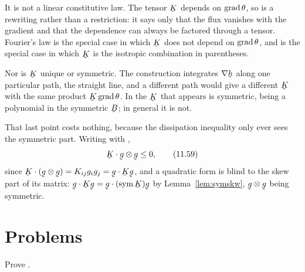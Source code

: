 \begin{remark}\label{rem:ch11Kread}
It is not a linear constitutive law. The tensor $\bK$ depends on
$\operatorname{grad}\theta$, so  is a rewriting rather than a restriction:
it says only that the flux vanishes with the gradient and that the
dependence can always be factored through a tensor. Fourier's law is
the special case in which $\bK$ does not depend on $\operatorname{grad}\theta$, and
 is the special case in which $\bK$ is the isotropic
combination in parentheses.

Nor is $\bK$ unique or symmetric. The construction integrates
$\nabla\bh$ along one particular path, the straight line, and a
different path would give a different $\bK$ with the same product
$\bK\grad\theta$. In  the $\bK$ that appears is symmetric,
being a polynomial in the symmetric $\bB$; in general it is not.

That last point costs nothing, because the dissipation inequality only
ever sees the symmetric part. Writing  with ,
\begin{equation}
   \bK\cdot\bg\otimes\bg\leq0 ,
   \tag{11.59}\label{eq:11.59}
\end{equation}
since $\bK\cdot(\bg\otimes\bg)=K_{ij}g_{i}g_{j}=\ip\bg{\bK\bg}$, and a
quadratic form is blind to the skew part of its matrix: $\ip\bg{\bK\bg}
=\ip\bg{(\Sym\bK)\bg}$ by Lemma~\ref{lem:symskw}, $\bg\otimes\bg$ being
symmetric.
\end{remark}

\setcounter{problemenv}{0}
\section{Problems}\label{sec:problems:c11}

\begin{problem}
Prove .
\end{problem}

